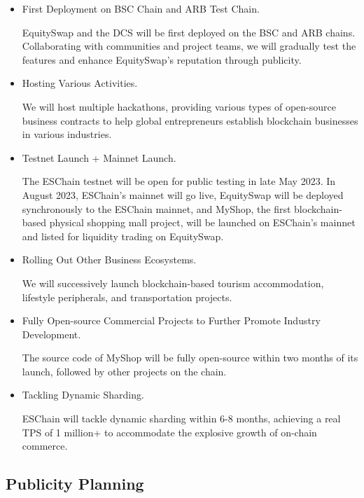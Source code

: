 \documentclass{article}
\begin{document}
\begin{itemize}
   \item First Deployment on BSC Chain and ARB Test Chain.

   EquitySwap and the DCS will be first deployed on the BSC and ARB chains. Collaborating with communities and project teams, we will gradually test the features and enhance EquitySwap's reputation through publicity.

   \item Hosting Various Activities.

   We will host multiple hackathons, providing various types of open-source business contracts to help global entrepreneurs establish blockchain businesses in various industries.

   \item Testnet Launch + Mainnet Launch.

   The ESChain testnet will be open for public testing in late May 2023. In August 2023, ESChain's mainnet will go live, EquitySwap will be deployed synchronously to the ESChain mainnet, and MyShop, the first blockchain-based physical shopping mall project, will be launched on ESChain's mainnet and listed for liquidity trading on EquitySwap.

   \item Rolling Out Other Business Ecosystems.

   We will successively launch blockchain-based tourism accommodation, lifestyle peripherals, and transportation projects.

   \item Fully Open-source Commercial Projects to Further Promote Industry Development.

   The source code of MyShop will be fully open-source within two months of its launch, followed by other projects on the chain.

   \item Tackling Dynamic Sharding.

   ESChain will tackle dynamic sharding within 6-8 months, achieving a real TPS of 1 million+ to accommodate the explosive growth of on-chain commerce. 
\end{itemize}

\subsection{Publicity Planning}
\end{document}
